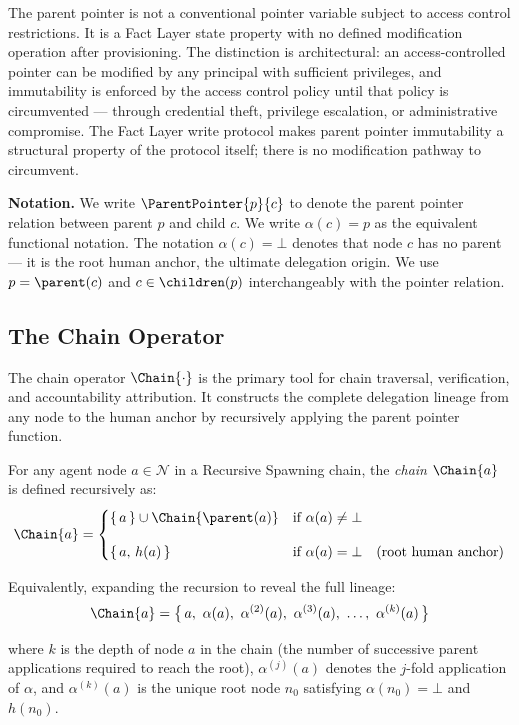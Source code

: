 The parent pointer is not a conventional pointer variable subject to access control restrictions. It is a Fact Layer state property with no defined modification operation after provisioning. The distinction is architectural: an access-controlled pointer can be modified by any principal with sufficient privileges, and immutability is enforced by the access control policy until that policy is circumvented --- through credential theft, privilege escalation, or administrative compromise. The Fact Layer write protocol makes parent pointer immutability a structural property of the protocol itself; there is no modification pathway to circumvent.

\medskip
\noindent\textbf{Notation.} We write $\ParentPointer{p}{c}$ to denote the parent pointer relation between parent $p$ and child $c$. We write $\alpha(c) = p$ as the equivalent functional notation. The notation $\alpha(c) = \bot$ denotes that node $c$ has no parent --- it is the root human anchor, the ultimate delegation origin. We use $p = \parent(c)$ and $c \in \children(p)$ interchangeably with the pointer relation.

\subsection{The Chain Operator}
\label{sec:chain-operator-definition}

The chain operator $\Chain{\cdot}$ is the primary tool for chain traversal, verification, and accountability attribution. It constructs the complete delegation lineage from any node to the human anchor by recursively applying the parent pointer function.

\begin{definition}
\label{def:chain-operator}
For any agent node $a \in \mathcal{N}$ in a Recursive Spawning chain, the \emph{chain} $\Chain{a}$ is defined recursively as:
\begin{equation}
\Chain{a} =
\begin{cases}
\{\,a\,\} \cup \Chain{\parent(a)} & \text{if } \alpha(a) \neq \bot \\[10pt]
\{\,a,\,h(a)\,\} & \text{if } \alpha(a) = \bot \quad \text{(root human anchor)}
\end{cases}
\label{eq:chain-recursive}
\end{equation}

Equivalently, expanding the recursion to reveal the full lineage:
\begin{equation}
\Chain{a} = \bigl\{\, a,\ \alpha(a),\ \alpha^{(2)}(a),\ \alpha^{(3)}(a),\ \ldots,\ \alpha^{(k)}(a) \,\bigr\}
\label{eq:chain-expanded}
\end{equation}

where $k$ is the depth of node $a$ in the chain (the number of successive parent applications required to reach the root), $\alpha^{(j)}(a)$ denotes the $j$-fold application of $\alpha$, and $\alpha^{(k)}(a)$ is the unique root node $n_0$ satisfying $\alpha(n_0) = \bot$ and $h(n_0)$.
\end{definition}

